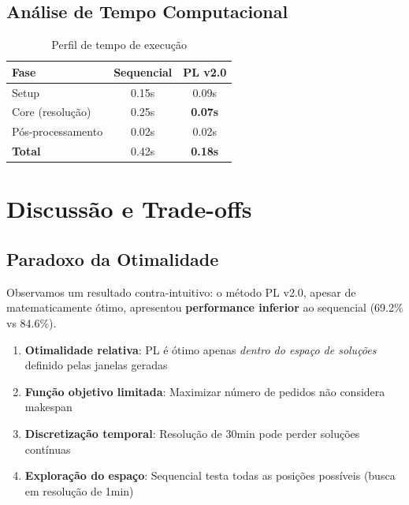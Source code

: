 \documentclass[12pt,a4paper]{article}
\theoremstyle{definition}
\begin{document}
\subsection{Análise de Tempo Computacional}

\begin{table}[H]
\centering
\begin{tabular}{@{}lcc@{}}
\toprule
\textbf{Fase} & \textbf{Sequencial} & \textbf{PL v2.0} \\
\midrule
Setup & 0.15s & 0.09s \\
Core (resolução) & 0.25s & \textbf{0.07s} \\
Pós-processamento & 0.02s & 0.02s \\
\midrule
\textbf{Total} & 0.42s & \textbf{0.18s} \\
\bottomrule
\end{tabular}
\caption{Perfil de tempo de execução}
\label{tab:tempo_execucao}
\end{table}

\section{Discussão e Trade-offs}

\subsection{Paradoxo da Otimalidade}

Observamos um resultado contra-intuitivo: o método PL v2.0, apesar de matematicamente ótimo, apresentou \textbf{performance inferior} ao sequencial (69.2\% vs 84.6\%).

\begin{tcolorbox}[colback=yellow!10!white,colframe=orange!75!black,title=Explicação do Paradoxo]
\begin{enumerate}
    \item \textbf{Otimalidade relativa}: PL é ótimo apenas \textit{dentro do espaço de soluções} definido pelas janelas geradas
    \item \textbf{Função objetivo limitada}: Maximizar número de pedidos não considera makespan
    \item \textbf{Discretização temporal}: Resolução de 30min pode perder soluções contínuas
    \item \textbf{Exploração do espaço}: Sequencial testa todas as posições possíveis (busca em resolução de 1min)
\end{enumerate}
\end{tcolorbox}
\end{document}
